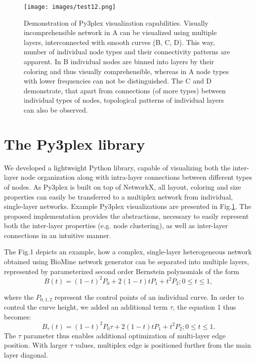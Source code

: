 \begin{figure}
\texttt{[image: images/test12.png]}
\caption{Demonstration of Py3plex visualization capabilities. Visually incomprehensible network in A can be visualized using multiple layers, interconnected with smooth curves (B, C, D). This way, number of individual node types and their connectivity patterns are apparent. In B individual nodes are binned into layers by their coloring and thus visually comprehensible, whereas in A node types with lower frequencies can not be distinguished. The C and D demonstrate, that apart from connections (of more types) between individual types of nodes, topological patterns of individual layers can also be observed.}
\label{mainfig}
\end{figure}

\section{The Py3plex library}
We developed a lightweight Python library, capable of visualizing both the inter-layer node organization along with intra-layer connections between different types of nodes. As Py3plex is built on top of NetworkX, all layout, coloring and size properties can easily be transferred to a multiplex network from individual, single-layer networks. Example Py3plex visualizations are presented in Fig.\ref{mainfig}. The proposed implementation provides the abstractions, necessary to easily represent both the inter-layer properties (e.g. node clustering), as well as inter-layer connections in an intuitive manner. 

The Fig.1 depicts an example, how a complex, single-layer heterogeneous network obtained using BioMine network generator \cite{eronen2012biomine} can be separated into multiple layers, represented by parameterized second order Bernstein polynomials of the form
\begin{equation}
B(t) = (1 - t)^{2} P_{0} + 2(1-t)tP_{1}+t^{2}P_{2}; 0 \leq t \leq 1,
\end{equation}

where the $P_{0,1,2}$ represent the control points of an individual curve. In order to control the curve height, we added an additional term $\tau$, the equation 1 thus becomes:
\begin{equation}
B_{\tau}(t) = (1 - t)^{2} P_{0} \tau + 2(1-t)tP_{1}+t^{2}P_{2}; 0 \leq t \leq 1.
\end{equation}
The $\tau$ parameter thus enables additional optimization of multi-layer edge position. With larger $\tau$ values, multiplex edge is positioned further from the main layer diagonal.

